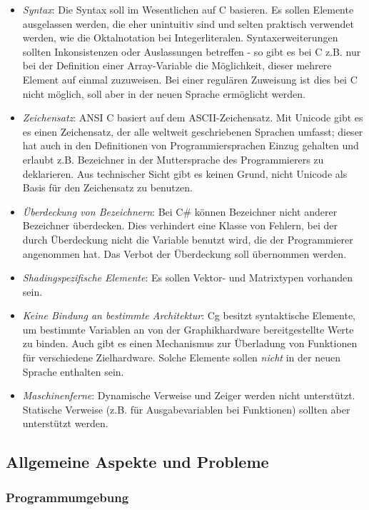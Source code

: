 \documentclass[twoside,a4paper,fleqn,12pt]{article}
\begin{document}
\begin{itemize}
\item \emph{Syntax}: Die Syntax soll im Wesentlichen auf C basieren. Es sollen Elemente ausgelassen werden, die eher 
unintuitiv sind und selten praktisch verwendet werden, wie die Oktalnotation bei Integerliteralen.
Syntaxerweiterungen sollten Inkonsistenzen oder Auslassungen betreffen - so gibt es bei C z.B. 
nur bei der Definition einer Array-Variable die Möglichkeit, dieser mehrere Element auf einmal zuzuweisen.
Bei einer regulären Zuweisung ist dies bei C nicht möglich, soll aber in der neuen Sprache ermöglicht werden.
\item \emph{Zeichensatz}: ANSI C basiert auf dem ASCII-Zeichensatz. %
Mit Unicode gibt es es einen Zeichensatz, der alle weltweit geschriebenen Sprachen umfasst; dieser
hat auch in den Definitionen von Programmiersprachen Einzug gehalten %
und erlaubt z.B. Bezeichner in der Muttersprache des Programmierers zu deklarieren.
Aus technischer Sicht gibt es keinen Grund, nicht Unicode als Basis für den Zeichensatz zu benutzen.
\item \emph{Überdeckung von Bezeichnern}: Bei C\# können Bezeichner nicht anderer Bezeichner überdecken. Dies
verhindert eine Klasse von Fehlern, bei der durch Überdeckung nicht die Variable benutzt wird, die der
Programmierer angenommen hat. Das Verbot der Überdeckung soll übernommen werden.
\item \emph{Shadingspezifische Elemente}: Es sollen Vektor- und Matrixtypen vorhanden sein.
\item \emph{Keine Bindung an bestimmte Architektur}: Cg besitzt syntaktische Elemente, um bestimmte Variablen an
von der Graphikhardware bereitgestellte Werte zu binden. Auch gibt es einen Mechanismus zur Überladung von Funktionen
für verschiedene Zielhardware. Solche Elemente sollen \emph{nicht} in der neuen Sprache enthalten sein.
\item \emph{Maschinenferne}: Dynamische Verweise und 
Zeiger werden nicht unterstützt. Statische Verweise (z.B. für Ausgabevariablen bei Funktionen) sollten aber unterstützt
werden.
\end{itemize}

\newpage

\subsection{Allgemeine Aspekte und Probleme}

\subsubsection{Programmumgebung}
\end{document}

